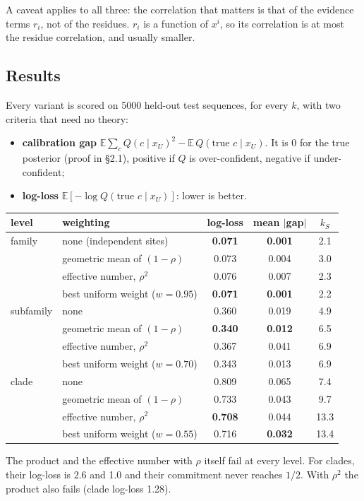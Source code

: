 \documentclass[11pt,a4paper]{article}
\newcommand{\E}{\mathbb{E}}
\begin{document}
A caveat applies to all three: the correlation that matters is that of the evidence terms $r_i$, not of the residues.
$r_i$ is a function of $x^i$, so its correlation is at most the residue correlation, and usually smaller.

\subsection{Results}
Every variant is scored on 5000 held-out test sequences, for every $k$, with two criteria that need no theory:
\begin{itemize}[nosep]
\item \textbf{calibration gap} $\E\sum_cQ(c\mid x_U)^2-\E\,Q(\text{true }c\mid x_U)$. It is 0 for the true posterior
(proof in \S2.1), positive if $Q$ is over-confident, negative if under-confident;
\item \textbf{log-loss} $\E[-\log Q(\text{true }c\mid x_U)]$: lower is better.
\end{itemize}
\begin{center}\small
\begin{tabular}{llccc}
\toprule
level & weighting & log-loss & mean $|$gap$|$ & $k_S$\\
\midrule
family & none (independent sites) & \textbf{0.071} & \textbf{0.001} & 2.1\\
 & geometric mean of $(1-\rho)$ & 0.073 & 0.004 & 3.0\\
 & effective number, $\rho^2$ & 0.076 & 0.007 & 2.3\\
 & best uniform weight ($w=0.95$) & \textbf{0.071} & \textbf{0.001} & 2.2\\
\midrule
subfamily & none & 0.360 & 0.019 & 4.9\\
 & geometric mean of $(1-\rho)$ & \textbf{0.340} & \textbf{0.012} & 6.5\\
 & effective number, $\rho^2$ & 0.367 & 0.041 & 6.9\\
 & best uniform weight ($w=0.70$) & 0.343 & 0.013 & 6.9\\
\midrule
clade & none & 0.809 & 0.065 & 7.4\\
 & geometric mean of $(1-\rho)$ & 0.733 & 0.043 & 9.7\\
 & effective number, $\rho^2$ & \textbf{0.708} & 0.044 & 13.3\\
 & best uniform weight ($w=0.55$) & 0.716 & \textbf{0.032} & 13.4\\
\bottomrule
\end{tabular}
\end{center}
The product and the effective number with $\rho$ itself fail at every level. For clades, their log-loss is 2.6 and 1.0
and their commitment never reaches $1/2$. With $\rho^2$ the product also fails (clade log-loss 1.28).
\end{document}
